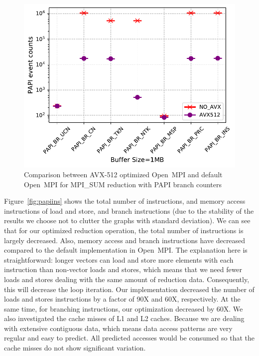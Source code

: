 \documentclass[5p,times,twocolumn]{elsarticle}
\newcommand{\ompi}[0]{Open~MPI\xspace}
\begin{document}
\begin{figure}[h]
    \centering
    \includegraphics[width=\linewidth]{papi_BR_review.pdf}
    \caption{Comparison between AVX-512 optimized \ompi and default \ompi for MPI\_SUM reduction with PAPI branch counters}
    \label{fig:papibr}
\end{figure}

Figure~\ref{fig:papiins} shows the total number of instructions, and memory access instructions of
load and store, and branch instructions (due to the
stability of the results we choose not to clutter the graphs with
standard deviation).
We can see that for our optimized reduction operation, the total number of
instructions is largely decreased. Also, memory access and branch instructions
have decreased compared to the default implementation in \ompi.
The explanation here is straightforward: longer vectors can load and store more
elements with each instruction than non-vector loads and stores, which means that
we need fewer loads and stores dealing with the same amount of reduction data.
Consequently, this will decrease the loop iteration.
%
Our implementation decreased the number of loads and stores instructions
by a factor of 90X and 60X, respectively.  At the same time, for
branching instructions, our optimization decreased by 60X.  We also
investigated the cache misses of L1 and L2 caches. Because we are
dealing with extensive contiguous data, which means data access
patterns are very regular and easy to predict. All predicted accesses
would be consumed so that the cache misses do not show significant
variation.
\end{document}
